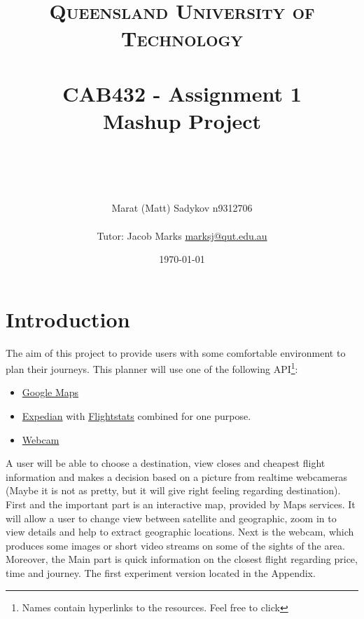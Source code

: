 \documentclass[12pt]{article}
\title{	
	\normalfont \normalsize 
	\textsc{Queensland University of Technology} \\ [25pt] 
	\horrule{0.5pt} \\[0.4cm] %
	\huge CAB432 - Assignment 1 \\ Mashup Project \\ %
	\author{ Marat (Matt) Sadykov \small n9312706 \\ \\ Tutor: Jacob Marks \small \underline{marksj@qut.edu.au}}
	\date{\normalsize\today} %
	\horrule{2pt} \\[0.5cm] %
}
\numberwithin{equation}{section} %
\numberwithin{figure}{section} %
\numberwithin{table}{section} %
\begin{document}
\maketitle
\newpage
\tableofcontents
\newpage
\section{Introduction}	

		The aim of this project to provide users with some comfortable environment to plan their journeys. This planner will use one of the following API\footnote{Names contain hyperlinks to the resources. Feel free to click}: 
		
		\begin{itemize}
			\item \href{https://developers.google.com/maps/documentation/}{Google Maps}
			\item \href{https://hackathon.expedia.com/docs/public/api/Flights Overview/}{Expedian} with \href{https://api.flightstats.com/flex/flightstatus/rest/v2/json/route/status/}{Flightstats} combined for one purpose.
			\item \href{https://developers.webcams.travel/\#webcams/list}{Webcam}
		\end{itemize}    
		A user will be able to choose a destination, view closes and cheapest flight information and makes a decision based on a picture from realtime webcameras (Maybe it is not as pretty, but it will give right feeling regarding destination). First and the important part is an interactive map, provided by Maps services. It will allow a user to change view between satellite and geographic, zoom in to view details and help to extract geographic locations. Next is the webcam, which produces some images or short video streams on some of the sights of the area. Moreover, the Main part is quick information on the closest flight regarding price, time and journey. The first experiment version located in the Appendix.    
\end{document}
